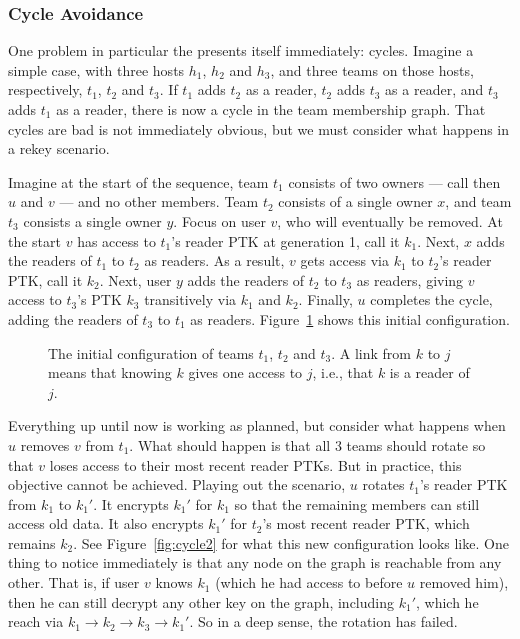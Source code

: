 \subsubsection{Cycle Avoidance}
\label{sec:team-index-range}

One problem in particular the presents itself immediately: cycles.
Imagine a simple case, with three hosts $h_1$, $h_2$ and $h_3$, and three teams
on those hosts, respectively, $t_1$, $t_2$ and $t_3$. If $t_1$ adds $t_2$ as a
reader, $t_2$ adds $t_3$ as a reader, and $t_3$ adds $t_1$ as a reader, there is
now a cycle in the team membership graph. That cycles are bad is not immediately
obvious, but we must consider what happens in a rekey scenario.

Imagine at the start of the sequence, team $t_1$ consists of two owners --- call
then $u$ and $v$ --- and no other members. Team $t_2$ consists of a single owner
$x$, and team $t_3$ consists a single owner $y$. Focus on user $v$, who will
eventually be removed.  At the start $v$ has access to $t_1$'s reader PTK at
generation 1, call it $k_1$.  Next, $x$ adds the readers of $t_1$ to $t_2$
as readers. As a result, $v$ gets access via $k_1$ to $t_2$'s reader PTK,
call it $k_2$. Next, user $y$ adds the readers of $t_2$ to $t_3$ as readers,
giving $v$ access to $t_3$'s PTK $k_3$ transitively via $k_1$ and $k_2$.
Finally, $u$ completes the cycle, adding the readers of $t_3$ to $t_1$ as readers.
Figure~\ref{fig:cycle1} shows this initial configuration. 

\begin{figure}[ht]
    \centering
    \caption{The initial configuration of teams $t_1$, $t_2$ and $t_3$.
A link from $k$ to $j$ means that knowing $k$ gives one access to $j$, i.e., that $k$ is a reader of $j$.}
    \label{fig:cycle1}
\end{figure}


Everything up until now is working as planned, but consider what happens when
$u$ removes $v$ from $t_1$. What should happen is that all 3 teams should 
rotate so that $v$ loses access to their most recent reader PTKs. But in practice, this
objective cannot be achieved. Playing out the scenario, $u$ rotates $t_1$'s reader PTK
from $k_1$ to $k_1'$. It encrypts $k_1'$ for $k_1$ so that the remaining 
members can still access old data. It also encrypts $k_1'$ for $t_2$'s most recent reader
PTK, which remains $k_2$. See Figure~\ref{fig:cycle2} for what this new configuration looks like.
One thing to notice immediately is that any node on the graph is reachable from any other. That is,
if user $v$ knows $k_1$ (which he had access to before $u$ removed him), then he can still
decrypt any other key on the graph, including $k_1'$, which he reach via
$k_1 \rightarrow k_2 \rightarrow k_3 \rightarrow k_1'$. So in a deep sense, the 
rotation has failed. 

